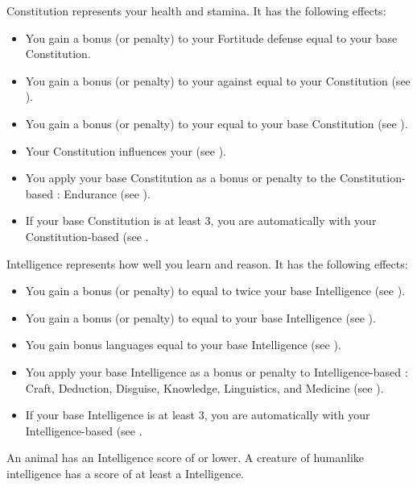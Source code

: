         \label{Constitution}
        {
            Constitution represents your health and stamina.
            It has the following effects:
            \begin{itemize}
                \item You gain a bonus (or penalty) to your Fortitude defense equal to your base Constitution.
                \item You gain a bonus (or penalty) to your  against  equal to your Constitution (see ).
                \item You gain a bonus (or penalty) to your  equal to your base Constitution (see ).
                \item Your Constitution influences your  (see ).
                \item You apply your base Constitution as a bonus or penalty to the Constitution-based : Endurance (see ).
                \item If your base Constitution is at least 3, you are automatically  with your Constitution-based  (see .
            \end{itemize}
        }

        \label{Intelligence}
        {
            Intelligence represents how well you learn and reason.
            It has the following effects:

            \begin{itemize}
                \item You gain a bonus (or penalty) to  equal to twice your base Intelligence (see ).
                \item You gain a bonus (or penalty) to  equal to your base Intelligence (see ).
                \item You gain bonus languages equal to your base Intelligence (see ).
                \item You apply your base Intelligence as a bonus or penalty to Intelligence-based : Craft, Deduction, Disguise, Knowledge, Linguistics, and Medicine (see ).
                \item If your base Intelligence is at least 3, you are automatically  with your Intelligence-based  (see .
            \end{itemize}

            \par An animal has an Intelligence score of  or lower.
            A creature of humanlike intelligence has a score of at least a  Intelligence.
        }

